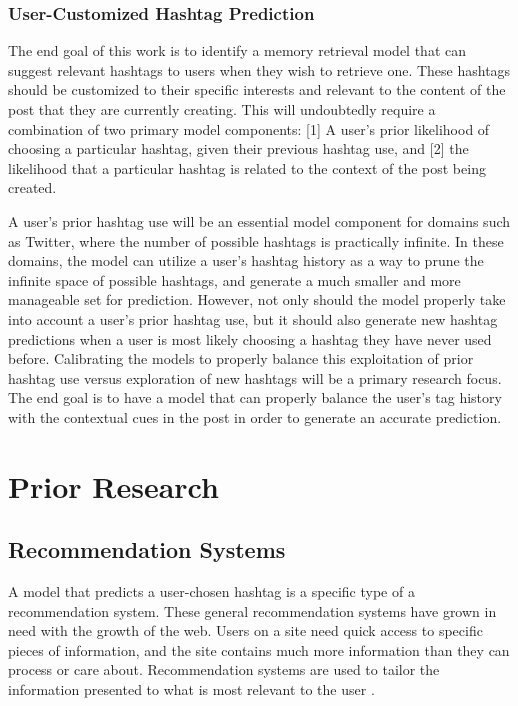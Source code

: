 \documentclass[man,floatsintext,donotrepeattitle]{apa6}
\begin{document}
\subsubsection{User-Customized Hashtag Prediction}

The end goal of this work is to identify a memory retrieval model that can suggest relevant hashtags to users when they wish to retrieve one.
These hashtags should be customized to their specific interests and relevant to the content of the post that they are currently creating.
This will undoubtedly require a combination of two primary model components:
[1] A user's prior likelihood of choosing a particular hashtag, given their previous hashtag use, and [2] the likelihood that a particular hashtag is related to the context of the post being created. 

A user's prior hashtag use will be an essential model component for domains such as Twitter, where the number of possible hashtags is practically infinite.
In these domains, the model can utilize a user's hashtag history as a way to prune the infinite space of possible hashtags, and generate a much smaller and more manageable set for prediction.
However, not only should the model properly take into account a user's prior hashtag use, but it should also generate new hashtag predictions when a user is most likely choosing a hashtag they have never used before.
Calibrating the models to properly balance this exploitation of prior hashtag use versus exploration of new hashtags will be a primary research focus.
The end goal is to have a model that can properly balance the user's tag history with the contextual cues in the post in order to generate an accurate prediction.

\section{Prior Research}

\subsection{Recommendation Systems}

A model that predicts a user-chosen hashtag is a specific type of a recommendation system.
These general recommendation systems have grown in need with the growth of the web.
Users on a site need quick access to specific pieces of information, and the site contains much more information than they can process or care about.
Recommendation systems are used to tailor the information presented to what is most relevant to the user \parencite{Pazzani2007}.
\end{document}
